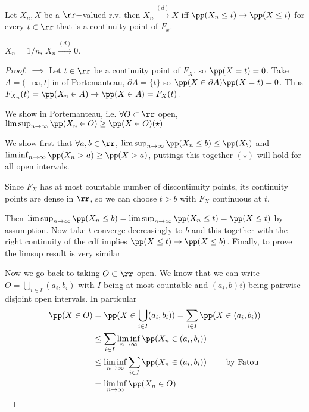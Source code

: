 \documentclass[../main.tex]{subfiles}
\begin{document}
\begin{theorem}
  Let $X_n, X$ be a $\rr-$valued r.v. then $X_n \overset{(d)}{\longrightarrow}
  X$ iff $\pp(X_n \leq t) \to \pp(X \leq t)$ for every $t \in \rr$ 
  that is a continuity point of $F_x$.
\end{theorem}
\begin{example}
  $X_n = 1/n$, $X_n \overset{(d)}{\longrightarrow} 0$.
\end{example}

\begin{proof}
  $\boxed{\implies}$ Let $t \in \rr$ be a continuity point of $F_X$, so $\pp(X =
  t)  = 0$. Take $A = (-\infty, t]$ in  of Portemanteau, $\partial A =
  \{ t \} $ so $\pp(X \in \partial A) \pp(X = t) = 0$. Thus $F_{X_n}(t) =
  \pp(X_n \in A) \to \pp(X \in A) = F_X(t)$.

  \vspace{0.4em}
  \noindent
  \boxed{\impliedby} We show  in Portemanteau, i.e. $\forall O \subset
  \rr$ open, $\limsup_{n \to \infty} \pp(X_n \in O) \geq \pp(X \in O) (\star)$

  We show first that $\forall a, b \in \rr$, $\limsup_{n \to \infty} \pp(X_n
  \leq b) \leq \pp(X_b)$ and $\liminf_{n \to \infty} \pp(X_n > a) \geq \pp(X >
  a) $, puttings this together $(\star)$ will hold for all open intervals.

  Since $F_X$ has at most countable number of discontinuity points, its
  continuity points are dense in $\rr$, so we can choose $t > b$ with $F_X$
  continuous at $t$. 

  Then $\limsup_{n \to \infty} \pp(X_n \leq b) = \limsup_{n \to \infty} \pp(X_n
  \leq t) = \pp(X \leq t)$ by assumption. Now take $t$ converge decreasingly to
  $b$ and this together with the right continuity of the cdf implies $\pp(X \leq
  t) \to \pp(X \leq b)$. Finally, to prove the limsup result is very similar 

  \vspace{0.4em}
  \noindent
  Now we go back to taking $O \subset \rr$ open. We know that we can write $O =
  \bigcup_{i \in I} (a_i, b_i)$ with $I$ being at most countable and $(a_i,
  b)i)$ being pairwise disjoint open intervals. In particular
  \begin{align*}
    \pp(X \in O)  &= \pp(X \in \bigcup_{i \in I} (a_i, b_i)) = \sum_{i \in I}
    \pp(X \in (a_i, b_i)) \\
    &\leq \sum_{i \in I} \liminf_{n \to \infty} \pp(X_n \in (a_i, b_i )) \\ 
    &\leq \liminf_{n \to \infty} \sum_{i \in I} \pp(X_n \in (a_i, b_i))
    \tag*{ by Fatou} \\
    &= \liminf_{n \to \infty} \pp(X_n \in O)
  \end{align*}
\end{proof}
\end{document}
